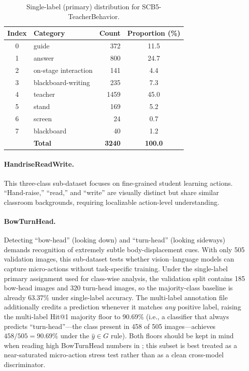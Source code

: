 \documentclass[symmetry,article,submit,pdftex,moreauthors]{Definitions/mdpi}
\begin{document}
\begin{table}[H]
\caption{Single-label (primary) distribution for SCB5-TeacherBehavior.}
\label{tab:dataset_single}
\centering
\begin{tabular}{clrc}
\toprule
\textbf{Index} & \textbf{Category} & \textbf{Count} & \textbf{Proportion (\%)} \\
\midrule
0 & guide & 372 & 11.5 \\
1 & answer & 800 & 24.7 \\
2 & on-stage interaction & 141 & 4.4 \\
3 & blackboard-writing & 235 & 7.3 \\
4 & teacher & 1459 & 45.0 \\
5 & stand & 169 & 5.2 \\
6 & screen & 24 & 0.7 \\
7 & blackboard & 40 & 1.2 \\
\midrule
  & \textbf{Total} & \textbf{3240} & \textbf{100.0} \\
\bottomrule
\end{tabular}
\end{table}

\paragraph{HandriseReadWrite.}
This three-class sub-dataset focuses on fine-grained student learning actions.
``Hand-raise,'' ``read,'' and ``write'' are visually distinct but share similar classroom backgrounds, requiring localizable action-level understanding.

\paragraph{BowTurnHead.}
Detecting ``bow-head'' (looking down) and ``turn-head'' (looking sideways) demands recognition of extremely subtle body-displacement cues.
With only 505 validation images, this sub-dataset tests whether vision--language models can capture micro-actions without task-specific training. Under the single-label primary assignment used for class-wise analysis, the validation split contains 185 bow-head images and 320 turn-head images, so the majority-class baseline is already 63.37\% under single-label accuracy. The multi-label annotation file additionally credits a prediction whenever it matches \emph{any} positive label, raising the multi-label Hit@1 majority floor to 90.69\% (i.e., a classifier that always predicts ``turn-head''---the class present in 458 of 505 images---achieves $458/505 = 90.69\%$ under the $\hat{y}\in G$ rule). Both floors should be kept in mind when reading high BowTurnHead numbers in ; this subset is best treated as a near-saturated micro-action stress test rather than as a clean cross-model discriminator.
\end{document}
